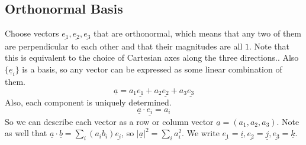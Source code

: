 \subsection{Orthonormal Basis}
Choose vectors $\underline{e_1},\underline{e_2},\underline{e_3}$ that are orthonormal, which means that any two of them are perpendicular to each other and that their magnitudes are all $1$.
Note that this is equivalent to the choice of Cartesian axes along the three directions..
Also $\{\underline{e}_i\}$ is a basis, so any vector can be expressed as some linear combination of them.
$$\underline{a}=a_1\underline{e_1}+a_2\underline{e_2}+a_3\underline{e_3}$$
Also, each component is uniquely determined.
$$\underline{a}\cdot\underline{e_i}=a_i$$
So we can describe each vector as a row or column vector $\underline{a}=(a_1,a_2,a_3)$.
Note as well that $\underline{a}\cdot\underline{b}=\sum_i(a_ib_i)\underline{e_i}$, so $|\underline{a}|^2=\sum_ia_i^2$.
We write $\underline{e_1}=\underline{i},\underline{e_2}=\underline{j}, \underline{e_3}=\underline{k}$.
